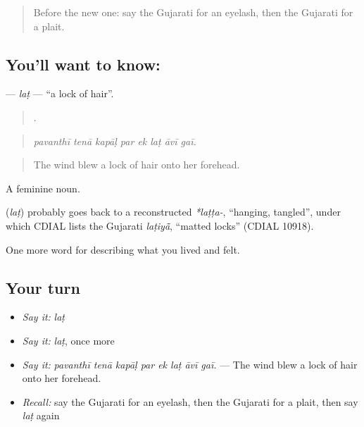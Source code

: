 \label{lesson:GU-C470-lat}



\begin{quote}
Before the new one: say the Gujarati for an eyelash, then the Gujarati for a plait.
\end{quote}

\subsection*{You'll want to know: }
\textbf{} — \emph{laṭ} — \textquotedblleft{}a lock of hair\textquotedblright{}.

\begin{quote}
       .
\end{quote}

\begin{quote}
\emph{pavanthī tenā kapāḷ par ek laṭ āvī gaī.}
\end{quote}

\begin{quote}
The wind blew a lock of hair onto her forehead.
\end{quote}

A feminine noun.

\begin{cousinweb}
\textbf{} (\emph{laṭ}) probably goes back to a reconstructed \emph{*laṭṭa-}, \textquotedblleft{}hanging, tangled\textquotedblright{}, under which CDIAL lists the Gujarati \emph{laṭiyā̃}, \textquotedblleft{}matted locks\textquotedblright{} (CDIAL 10918).
\end{cousinweb}

\begin{grammarlens}[title={What you've built}]
One more word for describing what you lived and felt.
\end{grammarlens}

\subsection*{Your turn}
\begin{itemize}
\raggedright
  \item \emph{Say it:} \emph{laṭ}
  \item \emph{Say it:} \emph{laṭ}, once more
  \item \emph{Say it:} \emph{pavanthī tenā kapāḷ par ek laṭ āvī gaī.} — The wind blew a lock of hair onto her forehead.
  \item \emph{Recall:} say the Gujarati for an eyelash, then the Gujarati for a plait, then say \emph{laṭ} again
\end{itemize}

